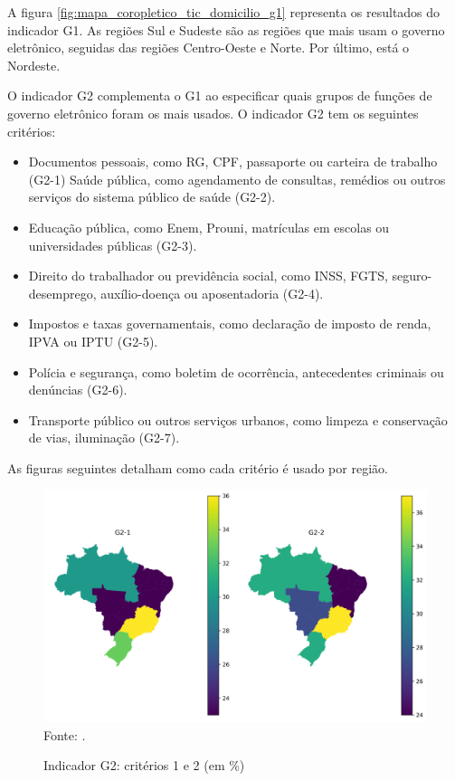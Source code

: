 A figura \ref{fig:mapa_coropletico_tic_domicilio_g1} representa os resultados do indicador G1. As regiões Sul e Sudeste são as regiões que mais usam o governo eletrônico, seguidas das regiões Centro-Oeste e Norte. Por último, está o Nordeste.

O indicador G2 complementa o G1 ao especificar quais grupos de funções de governo eletrônico foram os mais usados. O indicador G2 tem os seguintes critérios:

\begin{itemize}
	\item Documentos pessoais, como RG, CPF, passaporte ou carteira de trabalho (G2-1)
	Saúde pública, como agendamento de consultas, remédios ou outros serviços do sistema público de saúde (G2-2).
	\item Educação pública, como Enem, Prouni, matrículas em escolas ou universidades públicas (G2-3).
	\item Direito do trabalhador ou previdência social, como INSS, FGTS, seguro-desemprego, auxílio-doença ou aposentadoria (G2-4).
	\item Impostos e taxas governamentais, como declaração de imposto de renda, IPVA ou IPTU (G2-5).
	\item Polícia e segurança, como boletim de ocorrência, antecedentes criminais ou denúncias (G2-6).
	\item Transporte público ou outros serviços urbanos, como limpeza e conservação de vias, iluminação (G2-7).
\end{itemize}

As figuras seguintes detalham como cada critério é usado por região.

\begin{figure}[H]
	\centering
	\caption{Indicador G2: critérios 1 e 2 (em \%)}
	\includegraphics[width=1\linewidth]{figuras/mapa_coropletico_tic_domicilios_2024_g2_1_2.png}
	\label{fig:mapa_coropletico_tic_domicilios_2024_g2_1_2}
	\footnotesize{Fonte: \cite{tic_domicilios_2024_g2}.}
\end{figure}

